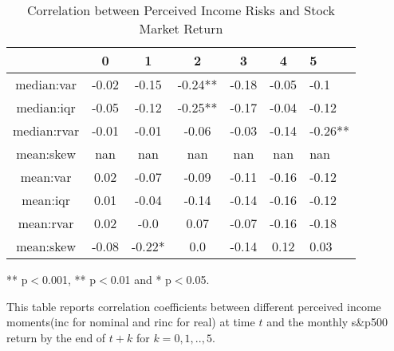 
\begin{table}[ht]
\centering
\begin{threeparttable}
\caption{Correlation between Perceived Income Risks and Stock Market Return}
\label{macro_corr}\begin{tabular}{ccccccl}
\toprule
{} &      0 &       1 &        2 &      3 &      4 &        5 \\
\midrule
median:var  &  -0.02 &   -0.15 &  -0.24** &  -0.18 &  -0.05 &     -0.1 \\
median:iqr  &  -0.05 &   -0.12 &  -0.25** &  -0.17 &  -0.04 &    -0.12 \\
median:rvar &  -0.01 &   -0.01 &    -0.06 &  -0.03 &  -0.14 &  -0.26** \\
mean:skew   &    nan &     nan &      nan &    nan &    nan &      nan \\
mean:var    &   0.02 &   -0.07 &    -0.09 &  -0.11 &  -0.16 &    -0.12 \\
mean:iqr    &   0.01 &   -0.04 &    -0.14 &  -0.14 &  -0.16 &    -0.12 \\
mean:rvar   &   0.02 &    -0.0 &     0.07 &  -0.07 &  -0.16 &    -0.18 \\
mean:skew   &  -0.08 &  -0.22* &      0.0 &  -0.14 &   0.12 &     0.03 \\
\bottomrule
\end{tabular}
\begin{tablenotes}
\item *** p$<$0.001, ** p$<$0.01 and * p$<$0.05. 
\item This table reports correlation coefficients between different perceived income moments(inc for nominal 
and rinc for real) at time 
$t$ and the monthly s\&p500 return by the end of $t+k$ for $k=0,1,..,5$. 
\end{tablenotes}
\end{threeparttable}
\end{table}